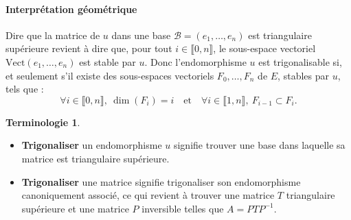 \documentclass[french]{article}
\newcommand{\inv}{^{-1}}
\newcommand{\Vect}{\text{Vect}}
\theoremstyle{plain}
\theoremstyle{definition}
\newtheorem*{terminologie}{Terminologie}
\theoremstyle{remark}
\begin{document}
	\paragraph{Interprétation géométrique}

	Dire que la matrice de $u$ dans une base $\mathcal{B}=(e_1,\ldots,e_n)$ est triangulaire supérieure revient à dire que, pour tout $i\in\llbracket0,n\rrbracket$, le sous-espace vectoriel $\Vect(e_1,\ldots,e_n)$ est stable par $u$. Donc l'endomorphisme $u$ est trigonalisable si, et seulement s'il existe des sous-espaces vectoriels $F_0,\ldots,F_n$ de $E$, stables par $u$, tels que : $$\forall i\in\llbracket0,n\rrbracket,\ \dim(F_i)=i\quad\text{et}\quad\forall i\in\llbracket1,n\rrbracket,\ F_{i-1}\subset F_i.$$
	
	\begin{terminologie}
		\begin{itemize}
		\item \textbf{Trigonaliser} un endomorphisme $u$ signifie trouver une base dans laquelle sa matrice est triangulaire supérieure.
		\item \textbf{Trigonaliser} une matrice signifie trigonaliser son endomorphisme canoniquement associé, ce qui revient à trouver une matrice $T$ triangulaire supérieure et une matrice $P$ inversible telles que $A=PTP\inv$.
	\end{itemize}
	\end{terminologie}
	
\end{document}
